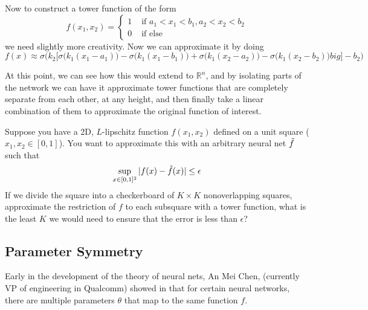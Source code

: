   \begin{example} 
    Now to construct a tower function of the form 
    \begin{equation}
      f(x_1, x_2) = \begin{cases} 1 & \text{ if } a_1 < x_1 < b_1, a_2 < x_2 < b_2 \\ 0 & \text{ if else} \end{cases}
    \end{equation}
    we need slightly more creativity. Now we can approximate it by doing 
    \begin{equation}
      f(x) \approx \sigma \bigg( k_2 \big[ \sigma\big( k_1 (x_1 - a_1)\big) - \sigma\big( k_1 (x_1 -b_1)\big) + \sigma \big( k_1 (x_2 - a_2)\big) - \sigma\big(k_1 (x_2 - b_2)\big)  big] - b_2\bigg)
    \end{equation}
  \end{example} 

  At this point, we can see how this would extend to $\mathbb{R}^n$, and by isolating parts of the network we can have it approximate tower functions that are completely separate from each other, at any height, and then finally take a linear combination of them to approximate the original function of interest.  

  \begin{theorem}[CS671 Fall 2023 PS5]
    Suppose you have a 2D, $L$-lipschitz function $f(x_1, x_2)$ defined on a unit square ($x_1, x_2 \in \left [0,1 \right ]$). You want to approximate this with an arbitrary neural net $\Tilde{f}$ such that
    \begin{equation}
      \sup_{x \in [0, 1]^2} |f(x) - \Tilde{f}(x)| \leq \epsilon
    \end{equation}
    If we divide the square into a checkerboard of $K \times K$ nonoverlapping squares, approximate the restriction of $f$ to each subsquare with a tower function, what is the least $K$ we would need to ensure that the error is less than $\epsilon$? 
  \end{theorem} 

\subsection{Parameter Symmetry}

  Early in the development of the theory of neural nets, An Mei Chen, (currently VP of engineering in Qualcomm) showed in \cite{symmetry} that for certain neural networks, there are multiple parameters $\theta$ that map to the same function $f$. 

